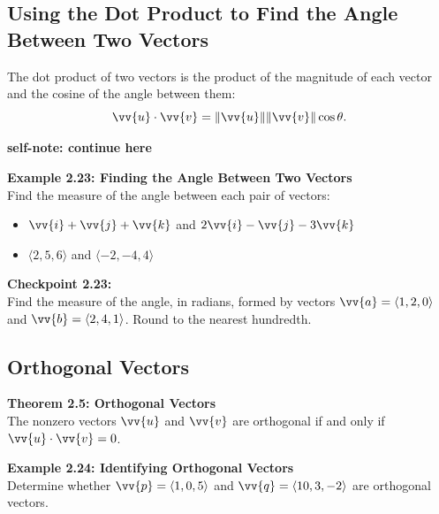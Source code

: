 \documentclass{article}
\begin{document}
\subsection*{Using the Dot Product to Find the Angle Between Two Vectors}

\begin{theorembox}
    The dot product of two vectors is the product of the magnitude of each vector and the cosine of the angle between them:
    \[
    \vv{u} \cdot \vv{v} = \|\vv{u}\| \|\vv{v}\| \cos \theta.
    \]
\end{theorembox}

\textbf{self-note: continue here}

\begin{examplebox}
    \textbf{Example 2.23: Finding the Angle Between Two Vectors} \\
    Find the measure of the angle between each pair of vectors:
    \begin{itemize}
        \item \(\vv{i} + \vv{j} + \vv{k}\) and \(2\vv{i} - \vv{j} - 3\vv{k}\)
        \item \(\langle 2, 5, 6 \rangle\) and \(\langle -2, -4, 4 \rangle\)
    \end{itemize}
\end{examplebox}

\begin{exercisebox}
    \textbf{Checkpoint 2.23:} \\
    Find the measure of the angle, in radians, formed by vectors \(\vv{a} = \langle 1, 2, 0 \rangle\) and \(\vv{b} = \langle 2, 4, 1 \rangle\). Round to the nearest hundredth.
\end{exercisebox}

\subsection*{Orthogonal Vectors}

\begin{theorembox}
    \textbf{Theorem 2.5: Orthogonal Vectors} \\
    The nonzero vectors \(\vv{u}\) and \(\vv{v}\) are orthogonal if and only if \(\vv{u} \cdot \vv{v} = 0\).
\end{theorembox}

\begin{examplebox}
    \textbf{Example 2.24: Identifying Orthogonal Vectors} \\
    Determine whether \(\vv{p} = \langle 1, 0, 5 \rangle\) and \(\vv{q} = \langle 10, 3, -2 \rangle\) are orthogonal vectors.
\end{examplebox}
\end{document}
